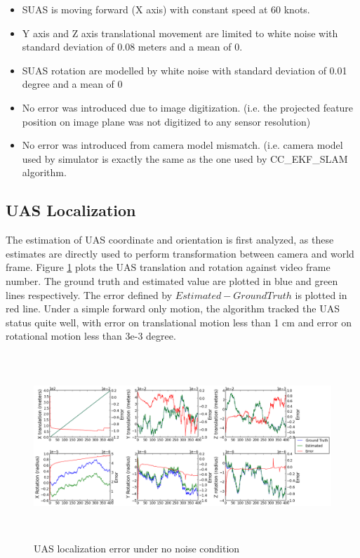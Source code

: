 \begin{itemize}
  \item SUAS is moving forward (X axis) with constant speed at 60 knots. 
  \item Y axis and Z axis translational movement are limited to white
  noise with standard deviation of 0.08 meters and a mean of 0.
  \item SUAS rotation are modelled by white noise with standard
  deviation of 0.01 degree and a mean of 0
  \item No error was introduced due to image digitization. (i.e. the
  projected feature position on image plane was not digitized to any
  sensor resolution)
  \item No error was introduced from camera model mismatch. (i.e.
  camera model used by simulator is exactly the same as the one used
  by CC\_EKF\_SLAM algorithm.
\end{itemize}

\subsection{UAS Localization}
The estimation of UAS coordinate and orientation is first analyzed, as 
these estimates are directly used to perform transformation between 
camera and world frame. Figure \ref{fig:simfig1} plots the UAS 
translation and rotation against video frame number. The ground truth 
and estimated value are plotted in blue and green lines respectively. 
The error defined by $Estimated-Ground Truth$ is plotted in red line. 
Under a simple forward only motion, the algorithm tracked the UAS status 
quite well, with error on translational motion less than 1 cm and error 
on rotational motion less than 3e-3 degree. 

\begin{figure}[h]
\centering
\includegraphics[width=15cm, height=7cm]{./Figures/SimulationFigures/Figure1.png}
\caption{UAS localization error under no noise condition}
\label{fig:simfig1}
\end{figure}
\FloatBarrier

